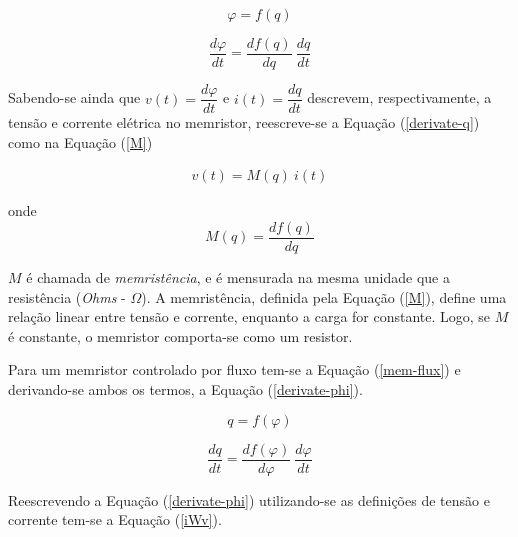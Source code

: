 \documentclass{ceel}
\begin{document}
\begin{multicols}{2}
\begin{equation}\label{mem-charge}
\varphi = f(q)
\end{equation}

\begin{equation}\label{derivate-q}
\dfrac{d\varphi}{dt}=\dfrac{df(q)}{dq} \ \dfrac{dq}{dt}
\end{equation}
\vspace{0.1cm}

Sabendo-se ainda que $v(t)=\dfrac{d\varphi}{dt}$ e $i(t)=\dfrac{dq}{dt}$ descrevem, respectivamente, a tensão e corrente elétrica no memristor, 
reescreve-se a Equação (\ref{derivate-q}) como na Equação (\ref{M}) 

\begin{gather}\label{vMi}
v(t)=M(q)\ i(t)
\end{gather}

\noindent onde
\begin{equation} \label{M}
M(q) =\dfrac{df(q)}{dq}
\end{equation}
\vspace{0.05cm}

$M$ é chamada de \textit{memristência}, e é mensurada na mesma unidade que a resistência (\textit{Ohms} - $\Omega$). A memristência, definida pela Equação (\ref{M}), define uma relação linear entre tensão e corrente, enquanto a carga for constante. Logo, se $M$ é constante, o memristor comporta-se como um resistor.

Para um memristor controlado por fluxo tem-se a Equação (\ref{mem-flux}) e derivando-se ambos os termos, a Equação (\ref{derivate-phi}).

\begin{equation}\label{mem-flux}
q = f(\varphi)
\end{equation}

\begin{equation}\label{derivate-phi}
\dfrac{dq}{dt}=\dfrac{df(\varphi)}{d\varphi} \ \dfrac{d\varphi}{dt}
\end{equation}
\vspace{0.05cm}

Reescrevendo a Equação (\ref{derivate-phi}) utilizando-se as definições de tensão e corrente tem-se a  Equação (\ref{iWv}).


\end{multicols}
\end{document}
